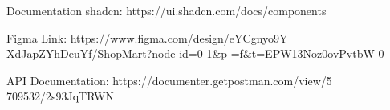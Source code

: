 
Documentation shadcn:
https://ui.shadcn.com/docs/components


Figma Link: 
https://www.figma.com/design/eYCgnyo9Y
 XdJapZYhDeuYf/ShopMart?node-id=0-1&p
 =f&t=EPW13Noz0ovPvtbW-0 


API Documentation:  
https://documenter.getpostman.com/view/5
 709532/2s93JqTRWN
